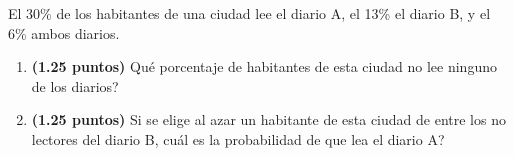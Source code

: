 
El 30\% de los habitantes de una ciudad lee el diario A, el 13\% el diario B, y el 6\% ambos diarios.
\begin{enumerate}[label=\alph*)]
\item \textbf{(1.25 puntos)} \textquestiondown{}Qué porcentaje de habitantes de esta ciudad no lee ninguno de los diarios?
\item \textbf{(1.25 puntos)} Si se elige al azar un habitante de esta ciudad de entre los no lectores del diario B, \textquestiondown{}cuál es la probabilidad de que lea el diario A?
\end{enumerate}
